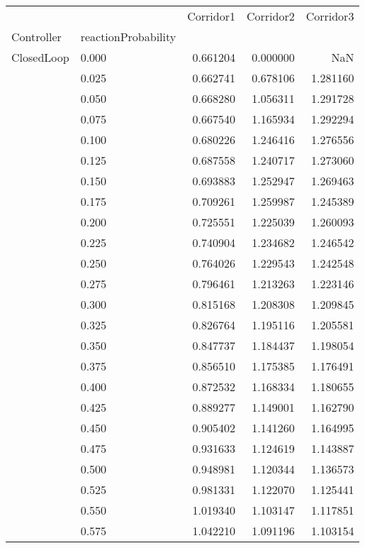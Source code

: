 \begin{tabular}{llrrr}
\toprule
         &       &  Corridor1 &  Corridor2 &  Corridor3 \\
Controller & reactionProbability &            &            &            \\
\midrule
ClosedLoop & 0.000 &   0.661204 &   0.000000 &        NaN \\
         & 0.025 &   0.662741 &   0.678106 &   1.281160 \\
         & 0.050 &   0.668280 &   1.056311 &   1.291728 \\
         & 0.075 &   0.667540 &   1.165934 &   1.292294 \\
         & 0.100 &   0.680226 &   1.246416 &   1.276556 \\
         & 0.125 &   0.687558 &   1.240717 &   1.273060 \\
         & 0.150 &   0.693883 &   1.252947 &   1.269463 \\
         & 0.175 &   0.709261 &   1.259987 &   1.245389 \\
         & 0.200 &   0.725551 &   1.225039 &   1.260093 \\
         & 0.225 &   0.740904 &   1.234682 &   1.246542 \\
         & 0.250 &   0.764026 &   1.229543 &   1.242548 \\
         & 0.275 &   0.796461 &   1.213263 &   1.223146 \\
         & 0.300 &   0.815168 &   1.208308 &   1.209845 \\
         & 0.325 &   0.826764 &   1.195116 &   1.205581 \\
         & 0.350 &   0.847737 &   1.184437 &   1.198054 \\
         & 0.375 &   0.856510 &   1.175385 &   1.176491 \\
         & 0.400 &   0.872532 &   1.168334 &   1.180655 \\
         & 0.425 &   0.889277 &   1.149001 &   1.162790 \\
         & 0.450 &   0.905402 &   1.141260 &   1.164995 \\
         & 0.475 &   0.931633 &   1.124619 &   1.143887 \\
         & 0.500 &   0.948981 &   1.120344 &   1.136573 \\
         & 0.525 &   0.981331 &   1.122070 &   1.125441 \\
         & 0.550 &   1.019340 &   1.103147 &   1.117851 \\
         & 0.575 &   1.042210 &   1.091196 &   1.103154 \\

\end{tabular}

